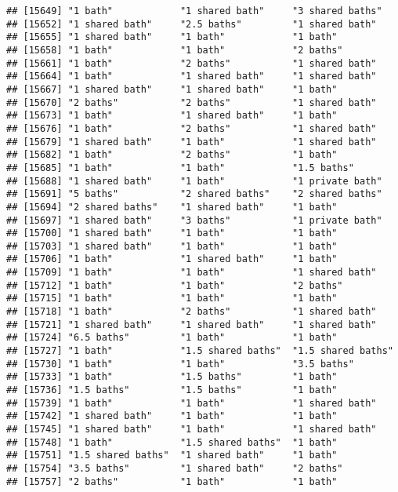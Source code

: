 \documentclass[
]{article}
\begin{document}
\begin{verbatim}
## [15649] "1 bath"            "1 shared bath"     "3 shared baths"   
## [15652] "1 shared bath"     "2.5 baths"         "1 shared bath"    
## [15655] "1 shared bath"     "1 bath"            "1 bath"           
## [15658] "1 bath"            "1 bath"            "2 baths"          
## [15661] "1 bath"            "2 baths"           "1 shared bath"    
## [15664] "1 bath"            "1 shared bath"     "1 shared bath"    
## [15667] "1 shared bath"     "1 shared bath"     "1 bath"           
## [15670] "2 baths"           "2 baths"           "1 shared bath"    
## [15673] "1 bath"            "1 shared bath"     "1 bath"           
## [15676] "1 bath"            "2 baths"           "1 shared bath"    
## [15679] "1 shared bath"     "1 bath"            "1 shared bath"    
## [15682] "1 bath"            "2 baths"           "1 bath"           
## [15685] "1 bath"            "1 bath"            "1.5 baths"        
## [15688] "1 shared bath"     "1 bath"            "1 private bath"   
## [15691] "5 baths"           "2 shared baths"    "2 shared baths"   
## [15694] "2 shared baths"    "1 shared bath"     "1 bath"           
## [15697] "1 shared bath"     "3 baths"           "1 private bath"   
## [15700] "1 shared bath"     "1 bath"            "1 bath"           
## [15703] "1 shared bath"     "1 bath"            "1 bath"           
## [15706] "1 bath"            "1 shared bath"     "1 bath"           
## [15709] "1 bath"            "1 bath"            "1 shared bath"    
## [15712] "1 bath"            "1 bath"            "2 baths"          
## [15715] "1 bath"            "1 bath"            "1 bath"           
## [15718] "1 bath"            "2 baths"           "1 shared bath"    
## [15721] "1 shared bath"     "1 shared bath"     "1 shared bath"    
## [15724] "6.5 baths"         "1 bath"            "1 bath"           
## [15727] "1 bath"            "1.5 shared baths"  "1.5 shared baths" 
## [15730] "1 bath"            "1 bath"            "3.5 baths"        
## [15733] "1 bath"            "1.5 baths"         "1 bath"           
## [15736] "1.5 baths"         "1.5 baths"         "1 bath"           
## [15739] "1 bath"            "1 bath"            "1 shared bath"    
## [15742] "1 shared bath"     "1 bath"            "1 bath"           
## [15745] "1 shared bath"     "1 bath"            "1 shared bath"    
## [15748] "1 bath"            "1.5 shared baths"  "1 bath"           
## [15751] "1.5 shared baths"  "1 shared bath"     "1 bath"           
## [15754] "3.5 baths"         "1 shared bath"     "2 baths"          
## [15757] "2 baths"           "1 bath"            "1 bath"           

\end{verbatim}
\end{document}
